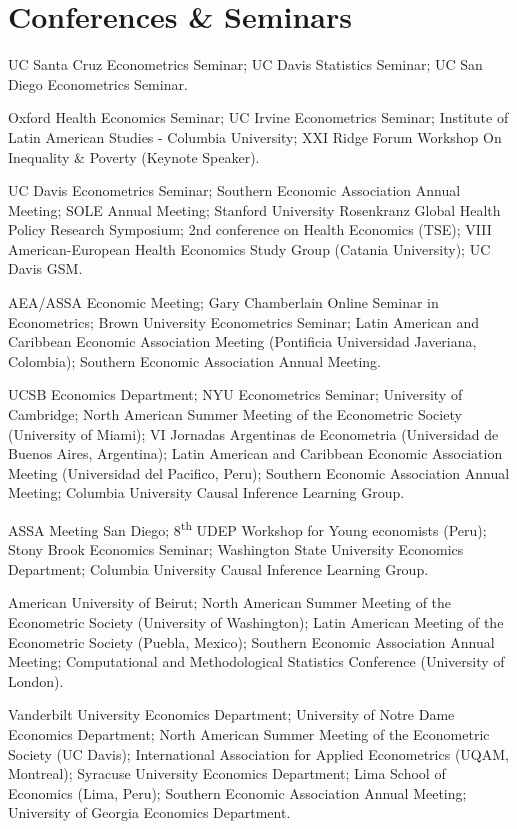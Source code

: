 \documentclass[11pt]{article}
\let\cvsection\section
\renewcommand{\section}{\Needspace{8\baselineskip}\cvsection}
\newcommand{\yr}[1]{{\sffamily\footnotesize\color{muted}#1}}
\begin{document}
\section{Conferences \& Seminars}
  \begin{yrlist}
\item[\yr{2026}] UC Santa Cruz Econometrics Seminar; UC Davis Statistics Seminar; UC San Diego Econometrics Seminar.
\item[\yr{2025}] Oxford Health Economics Seminar; UC Irvine Econometrics Seminar; Institute of Latin American Studies - Columbia University; XXI Ridge Forum Workshop On Inequality \& Poverty (Keynote Speaker).
\item[\yr{2024}] UC Davis Econometrics Seminar; Southern Economic Association Annual Meeting; SOLE Annual Meeting; Stanford University Rosenkranz Global Health Policy Research Symposium; 2nd conference on Health Economics (TSE); VIII American-European Health Economics Study Group (Catania University); UC Davis GSM.
\item[\yr{2023}] AEA/ASSA Economic Meeting; Gary Chamberlain Online Seminar in Econometrics; Brown University Econometrics Seminar; Latin American and Caribbean Economic Association Meeting (Pontificia Universidad Javeriana, Colombia); Southern Economic Association Annual Meeting.
\item[\yr{2022}] UCSB Economics Department; NYU Econometrics Seminar; University of Cambridge; North American Summer Meeting of the Econometric Society (University of Miami); VI Jornadas Argentinas de Econometria (Universidad de Buenos Aires, Argentina); Latin American and Caribbean Economic Association Meeting (Universidad del Pacifico, Peru); Southern Economic Association Annual Meeting; Columbia University Causal Inference Learning Group.
\item[\yr{2020/21}] ASSA Meeting San Diego; 8\textsuperscript{th} UDEP Workshop for Young economists (Peru); Stony Brook Economics Seminar; Washington State University Economics Department; Columbia University Causal Inference Learning Group.
\item[\yr{2019}] American University of Beirut; North American Summer Meeting of the Econometric Society (University of Washington); Latin American Meeting of the Econometric Society (Puebla, Mexico); Southern Economic Association Annual Meeting; Computational and Methodological Statistics Conference (University of London).
\item[\yr{2018}] Vanderbilt University Economics Department; University of Notre Dame Economics Department; North American Summer Meeting of the Econometric Society (UC Davis); International Association for Applied Econometrics (UQAM, Montreal); Syracuse University Economics Department; Lima School of Economics (Lima, Peru); Southern Economic Association Annual Meeting; University of Georgia Economics Department.

\end{yrlist}
\end{document}
